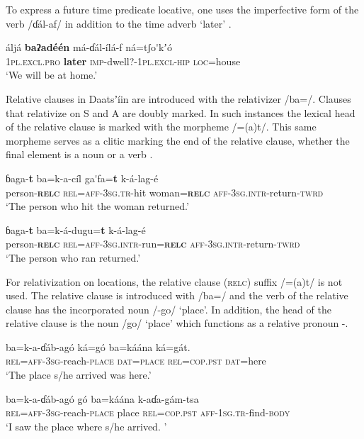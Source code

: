 \documentclass[output=paper]{langsci/langscibook}
\begin{document}
To express a future time predicate locative, one uses the imperfective form of the verb /ɗál-af/ in addition to the time adverb ‘later’ .

\ea\label{ex:ahlandc:81}
\gll
áljá    \textbf{baʔadéén}   má-ɗál-ílá-f                   ná=tʃo\'{ }kʼ\'{o} \\
\textsc{1pl.excl.pro}   \textbf{later}  \textsc{imp}{}-dwell?-\textsc{1pl.excl-hip} \textsc{loc}=house\\
\glt
‘We will be at home.’
\z

Relative clauses in Daatsʼíin are introduced with the relativizer /ba=/. Clauses that relativize on S and A are doubly marked. In such instances the lexical head of the relative clause is marked with the morpheme /=(a)t/. This same morpheme serves as a clitic marking the end of the relative clause, whether the final element is a noun  or a verb . 

\ea\label{ex:ahlandc:82}
\gll
ɓaga-\textbf{t}    ba=k-a-cíl    ga\'{ }fa=\textbf{t}  k-á-lag-é \\
person-\textbf{\textsc{relc}} \textsc{    rel=aff-3sg.tr}{}-hit  woman=\textbf{\textsc{relc}} \textsc{aff-3sg.intr}{}-return-\textsc{twrd}\\
\glt
‘The person who hit the woman returned.’
\z

\ea\label{ex:ahlandc:83}
\gll
ɓaga-\textbf{t}    ba=k-á-dugu=\textbf{t}    k-á-lag-é  \\
person-\textbf{\textsc{relc}} \textsc{    rel=aff-3sg.intr}{}-run=\textbf{\textsc{relc}} \textsc{aff-3sg.intr}{}-return-\textsc{twrd}\\
\glt
‘The person who ran returned.’
\z

For relativization on locations, the relative clause (\textsc{relc}) suffix /=(a)t/ is not used. The relative clause is introduced with /ba=/ and the verb of the relative clause has the incorporated noun /-go/ ‘place’.  In addition, the head of the relative clause is the noun /go/ ‘place’ which functions as a relative pronoun -.

\ea\label{ex:ahlandc:84}
\gll
ba=k-a-ɗáb-ag\'{o}  ká=g\'{o}  ba=káána  ká=gát. \\
\textsc{rel}\textsc{=aff-3sg}{}-reach-\textsc{place  dat}\textsc{=place}   \textsc{rel=cop.pst}  \textsc{dat}=here\\
\glt
 ‘The place s/he arrived was here.’
\z

\ea\label{ex:ahlandc:85}
\gll
ba=k-a-ɗáb-ag\'{o}    g\'{o}  ba=káána  k-aɗa-gám-tsa  \\
\textsc{rel=aff-3sg}{}-reach-\textsc{place}  place  \textsc{rel=cop.pst}   \textsc{aff-1sg.tr}{}-find-\textsc{body}\\
\glt
‘I saw the place where s/he arrived. ’
\z
\end{document}
